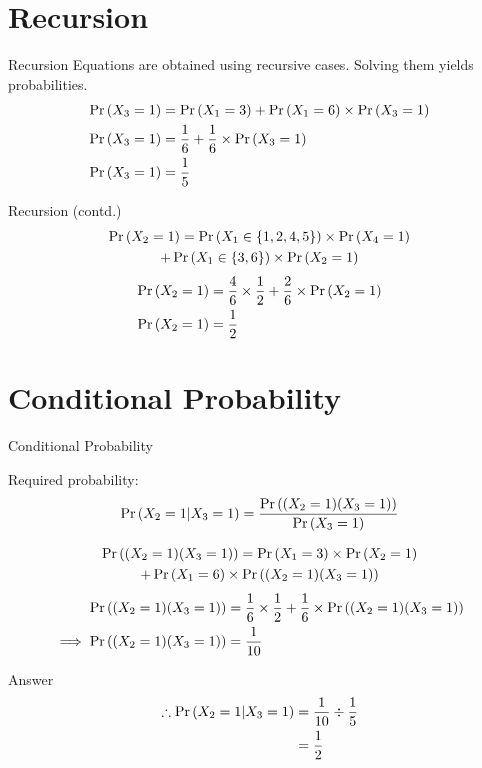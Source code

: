 \documentclass{beamer}
\begin{document}
\section{Recursion}
\begin{frame}{Recursion}
    Equations are obtained using recursive cases. Solving them yields probabilities. 
    \begin{align}
        \Pr\left(X_3 = 1\right) 
        &= \Pr\left(X_1 = 3\right) + \Pr\left(X_1 = 6\right) \times \Pr\left(X_3 = 1\right) \\
        \Pr\left(X_3 = 1\right) &= \frac{1}{6} + \frac{1}{6}  \times \Pr\left(X_3 = 1\right) \\
        \Pr\left(X_3 = 1\right) &= \frac{1}{5}
    \end{align}
\end{frame}
\begin{frame}{Recursion (contd.)}
    \begin{multline}
        \Pr\left(X_2 = 1\right) 
        = \Pr\left(X_1 \in \left\{1,2,4,5\right\} \right) \times \Pr\left(X_4 = 1\right) \\
        + \Pr\left(X_1 \in \left\{3, 6\right\} \right) \times \Pr\left(X_2 = 1\right) 
    \end{multline}
    \begin{align}
        \Pr\left(X_2 = 1\right) &= \frac{4}{6} \times \frac{1}{2} + \frac{2}{6}  \times \Pr\left(X_2 = 1\right) \\
        \Pr\left(X_2 = 1\right) &= \frac{1}{2}
    \end{align}
\end{frame}
\section{Conditional Probability}
\begin{frame}{Conditional Probability}
    \begin{block}{Required probability:}
    \begin{align}
        \Pr\left(X_2 = 1 | X_3 = 1\right) = \frac{\Pr\left((X_2 = 1)(X_3 = 1)\right)} {\Pr\left(X_3 = 1\right)}
    \end{align}
    \end{block}
    \begin{multline}
        \Pr\left((X_2 = 1)(X_3 = 1)\right) 
        = \Pr\left(X_1 = 3\right) \times \Pr\left(X_2 = 1\right) \\
        + \Pr\left(X_1 = 6\right) \times \Pr\left((X_2 = 1)(X_3 = 1)\right)
    \end{multline}
    \begin{align}
        \Pr\left((X_2 = 1)(X_3 = 1)\right) 
        &= \frac{1}{6} \times \frac{1}{2} 
        + \frac{1}{6} \times  \Pr\left((X_2 = 1)(X_3 = 1)\right) \\
        \implies \Pr\left((X_2 = 1)(X_3 = 1)\right) &= \frac{1}{10}
    \end{align}
\end{frame}
\begin{frame}{Answer}
    \begin{align}
        \therefore \Pr\left(X_2 = 1 | X_3 = 1\right) &= \frac{1}{10} \div \frac{1}{5} \\
        &= \frac{1}{2}
    \end{align}
\end{frame}
\end{document}
